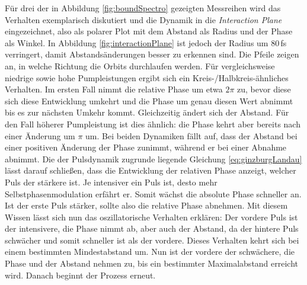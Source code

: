 \documentclass[bachelor,       %
               twoside,        %
               BCOR10mm,       %
               liststotoc,nomtotoc,bibtotoc, %
               english,ngerman, %
               final,          %
               ]{GAUBM}
\begin{document}
Für drei der in Abbildung \ref{fig:boundSpectro} gezeigten Messreihen wird das Verhalten exemplarisch diskutiert und die Dynamik in die \textit{Interaction Plane} eingezeichnet, also als polarer Plot mit dem Abstand als Radius und der Phase als Winkel.
In Abbildung \ref{fig:interactionPlane} ist jedoch der Radius um 80\,fs verringert, damit Abstandsänderungen besser zu erkennen sind.
Die Pfeile zeigen an, in welche Richtung die Orbits durchlaufen werden.
Für vergleichsweise niedrige sowie hohe Pumpleistungen ergibt sich ein Kreis-/Halbkreis-ähnliches Verhalten.
Im ersten Fall nimmt die relative Phase um etwa $2\pi$ zu, bevor diese sich diese Entwicklung umkehrt und die Phase um genau diesen Wert abnimmt bis es zur nächsten Umkehr kommt.
Gleichzeitig ändert sich der Abstand.
Für den Fall höherer Pumpleistung ist dies ähnlich: die Phase kehrt aber bereits nach einer Änderung um $\pi$ um.
Bei beiden Dynamiken fällt auf, dass der Abstand bei einer positiven Änderung der Phase zunimmt, während er bei einer Abnahme abnimmt.
Die der Pulsdynamik zugrunde liegende Gleichung \eqref{eq:ginzburgLandau} lässt darauf schließen, dass die Entwicklung der relativen Phase anzeigt, welcher Puls der stärkere ist.
Je intensiver ein Puls ist, desto mehr Selbstphasenmodulation erfährt er.
Somit wächst die absolute Phase schneller an.
Ist der erste Puls stärker, sollte also die relative Phase abnehmen.
Mit diesem Wissen lässt sich nun das oszillatorische Verhalten erklären:
Der vordere Puls ist der intensivere, die Phase nimmt ab, aber auch der Abstand, da der hintere Puls schwächer und somit schneller ist als der vordere.
Dieses Verhalten kehrt sich bei einem bestimmten Mindestabstand um.
Nun ist der vordere der schwächere, die Phase und der Abstand nehmen zu, bis ein bestimmter Maximalabstand erreicht wird.
Danach beginnt der Prozess erneut.
\end{document}
